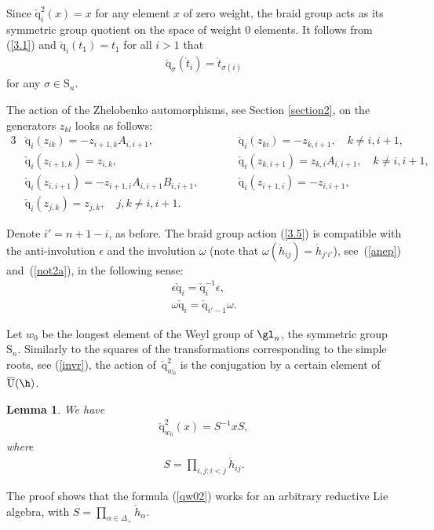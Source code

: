 \documentclass[pdftex]{sigma}
\newtheorem{lem}[theorem]{Lemma}
\def\nplus{\mathfrak{n}}\def\nn{\nonumber}\def\nin{\noindent}
\def\q{\check{\mathrm q}}\def\Q{\mathrm{Q}}\def\r#1{(\ref{#1})}\let\rf=\r
\def\s{z}\def\S{\mathrm {S}}\def\si{\sigma}\def\Sp{\S^{\nplus}}\def\sy{\acute{\sigma}}\def\th{\mathring{h}}
\def\tphi{A}\def\tpsi{A'}\def\tphiplus{B}\def\tpsiminus{B'}\def\ttphi{B}\def\ttpsi{B'}\def\ts{\hskip1pt}\def\tts{\hskip.5pt}
\def\tt{\mathring{t}}\def\U{\mathrm{U}}\def\Uh{\overline{\U}(\h)}\def\UU{\overline{\U}}\def\UUh{{\cal{D}}(\h)}
\numberwithin{equation}{section}
\begin{document}
Since
$\q_{i}^2(x)=x$ for any element $x$ of zero weight, the braid group acts as its symmetric group quotient on the space of weight 0 elements.
It follows from \rf{3.1} and $\q_{i}(t_1)=t_1$ for all $i>1$ that
\begin{gather}\label{3.2}
\q_{\sigma}(\tt_i)=\tt_{\sigma(i)}
\end{gather}
for any $\sigma\in \S_n$.


The action of the Zhelobenko automorphisms, see Section \ref{section2},  on the generators $\s_{kl}$  looks as follows:
\begin{alignat}{3}
& \q_i(\s_{ik})=-\s_{i+1,k}\tphi_{i,i+1} , \qquad  &&
\q_i(\s_{ki})=-\s_{k,i+1} ,\quad k\not=i,i+1 ,& \nonumber\\
&\q_i(\s_{i+1,k})=\s_{i,k} ,\qquad && \q_i(\s_{k,i+1})=\s_{k,i}\tphi_{i,i+1} ,\quad k\not=i,i+1 ,& \label{3.5}\\
& \q_i(\s_{i,i+1})=-\s_{i+1,i}\tphi_{i,i+1}\ttphi_{i,i+1} ,\qquad && \q_i(\s_{i+1,i})=-\s_{i,i+1} , & \nonumber\\
&\q_{i}(\s_{j,k})=\s_{j,k} ,\quad j,k\neq i,i+1 .\qquad &&&\nonumber
\end{alignat}

Denote $i'=n+1-i$, as before. The braid group action \rf{3.5} is compatible with the anti-involution $\epsilon$
and the involution $\omega$ (note that $\omega (\th_{ij})=\th_{j'i'}$),  see~\rf{anep} and~\rf{not2a}, in the following sense:
\begin{gather}
\epsilon  \q_i =\q_i^{-1}\epsilon  ,\\
 \omega  \q_i =\q_{i'-1}\omega .\label{qeps}
\end{gather}


Let $w_0$ be the longest element of the Weyl group of $\gl_n$, the symmetric group $\S_n$. Similarly to the squares of
the transformations corresponding to the simple roots, see \rf{invr}, the action of~$\q_{w_0}^2$ is the conjugation by a
certain element of $\Uh$.

\begin{lem}\label{lqw02}
We have
\begin{gather}\label{qw02}
\q_{w_0}^2(x)=S^{-1}xS  ,
\end{gather}
where
\begin{gather}
 S=\prod_{i,j:i<j}\th_{ij}  .\label{conjq02}
 \end{gather}
\end{lem}

The proof shows that the formula \rf{qw02} works for an arbitrary reductive Lie algebra, with $S=\prod_{\alpha\in \Delta_+}\th_{\alpha}$.
\end{document}
